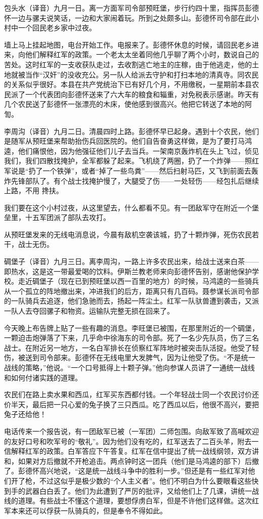 \documentclass[10pt]{book}
\begin{document}
包头水（译音）九月一日。离一方面军司令部预旺堡，步行约四十里，指挥员彭德怀一边与骡夫说笑话，一边和大家闹着玩。所到之处颇多山。彭德怀司令部在此小村中一个回民老乡家中过夜。

墙上马上挂起地图，电台开始工作。电报来了。彭德怀休息的时候，请回民老乡进来，向他们解释红军的政策。一个老太太坐着同他几乎聊了两个小时，数说自己的苦处。这时红军的一支收获队走过，去收割逃亡地主的庄稼，由于他逃走，他的土地就被当作“汉奸”的没收充公。另一队人给派去守护和打扫本地的清真寺。同农民的关系似乎很好。本县在共产党统治下已有好几个月，不用缴税，一星期前本县农民派了一个代表团向彭德怀送来了六大车的粮食和辎重，对免税表示感谢。昨天有几个农民送了彭德怀一张漂亮的木床，使他感到很高兴。他把它转送了本地的阿訇。

李周沟（译音）九月二日。清晨四时上路。彭德怀早已起身。遇到十个农民，他们是随军从预旺堡来帮助抬伤兵回医院的。他们自告奋勇这样做，是为了要打马鸿逵，他们痛恨他，因为他强征他们儿子去当兵。一架南京轰炸机在头上飞过，侦见我们，我们四散找掩护，全军都躲了起来。飞机绕了两圈，扔了一个炸弹——照红军说是“扔了一个铁弹”，或者“掉了一些鸟粪”——然后扫射马匹，又飞到前面去轰炸先锋部队了。有个战士找掩护慢了，大腿受了伤——一处轻伤——经包扎后继续上路，不用 搀扶。

我们要在这个小村过夜，从这里望去，什么都看不见。有一团敌军守在附近一个堡垒里，十五军团派了部队去攻打。

从预旺堡发来的无线电消息说，今晨有敌机空袭该城，扔了十颗炸弹，死伤农民若干，战士无伤。

碉堡子（译音）九月三日。离李周沟，一路上许多农民出来，给战士送来白茶——即热水，这是这一带最爱喝的饮料。伊斯兰教老师来向彭德怀告别，感谢他保护学校。走近碉堡子（现在已到预旺堡以西一百里的地方）的时候，马鸿逵的一些骑兵从一个孤立的阵地撤出来，冲进我们的后方，距离只有几百码。聂参谋长派司令部的一队骑兵去追逐，他们急驰而去，扬起一阵尘土。红军一队驮兽遭到袭击，又派一队人去夺回骡子和物资。运输队完整无损在回来了。

今天晚上布告牌上贴了一些有趣的消息。李旺堡已被围，在那里附近的一个碉堡，一颗迫击炮弹落了下来，几乎命中徐海东的司令部。死了一名少先队员，伤了三名战士。在附近另一地方，一名白军排长在侦察红军阵地时被突击队活捉。他受了轻伤，被送到司令部来。彭德怀在无线电里大发脾气，因为让他受了伤。“不是统一战线的策略，”他说。“一个口号抵得上十颗子弹。”他向参谋人员讲了一通统一战线和如何付诸实践的道理。

农民们在路上卖水果和西瓜，红军买东西都付钱。一个年轻战士同一个农民讨价还价半天，最后把一只心爱的兔子换了三只西瓜。吃了西瓜以后，他很不高兴，要把兔子还给他！

电话传来一个报告说，有一团敌军已被（一军团）二师包围。向敌军致了高喊欢迎的友好口号和吹军号的“敬礼”。因为他们没有吃的，红军送去了二百头羊，附去一信解释红军的政策。白军答应下午答复。红军在信中提出了统一战线纲领，双方讲和，如果对方后撤就不开枪追击。两点钟时这一团兵（他们是马鸿逵的部下）后撤了。彭德怀高兴地说，“这是统一战线斗争中的胜利一步。”但还是有一些红军对他们开了枪，不过这似乎是极少数的“个人主义者”。他们不明白为什么要眼看这些快到手的武器白白丢了。他们为此遭到了严厉的批评，又给他们上了几课，讲统一战线的道理。有些战士不懂这个道理，要想俘虏白军，但是不许他们这样做。这次红军本来还可以俘获一队骑兵的，但是奉令不得如此。
\end{document}
